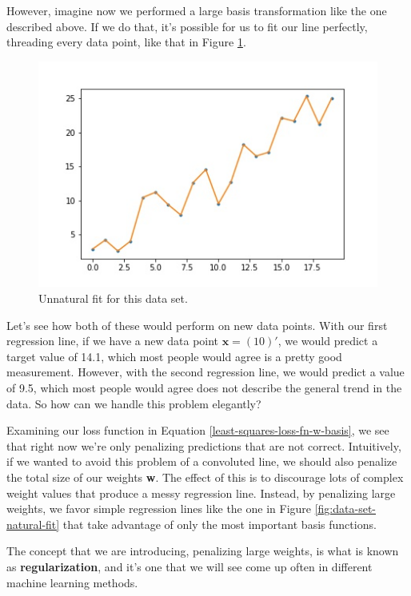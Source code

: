 However, imagine now we performed a large basis transformation like the one described above. If we do that, it's possible for us to fit our line perfectly, threading every data point, like that in Figure \ref{fig:data-set-unnatural-fit}.

\begin{figure}
    \centering
    \includegraphics[width=0.5\paperwidth]{../LinearRegression/fig/data_set_unnatural_fit_GEN.jpg}
    \caption{Unnatural fit for this data set.}
    \label{fig:data-set-unnatural-fit}
\end{figure}

Let's see how both of these would perform on new data points. With our first regression line, if we have a new data point $\textbf{x} = (10)'$, we would predict a target value of 14.1, which most people would agree is a pretty good measurement. However, with the second regression line, we would predict a value of 9.5, which most people would agree does not describe the general trend in the data. So how can we handle this problem elegantly?

Examining our loss function in Equation \ref{least-squares-loss-fn-w-basis}, we see that right now we're only penalizing predictions that are not correct. Intuitively, if we wanted to avoid this problem of a convoluted line, we should also penalize the total size of our weights \textbf{w}. The effect of this is to discourage lots of complex weight values that produce a messy regression line. Instead, by penalizing large weights, we favor simple regression lines like the one in Figure \ref{fig:data-set-natural-fit} that take advantage of only the most important basis functions.

The concept that we are introducing, penalizing large weights, is what is known as \textbf{regularization}, and it's one that we will see come up often in different machine learning methods.

